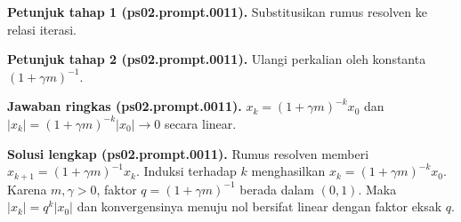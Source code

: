 \par\noindent\textbf{Petunjuk tahap 1 (ps02.prompt.0011).}
Substitusikan rumus resolven ke relasi iterasi.
\label{orig03:ps02:hint1:0011}
\par\noindent\textbf{Petunjuk tahap 2 (ps02.prompt.0011).}
Ulangi perkalian oleh konstanta $(1+\gamma m)^{-1}$.
\label{orig03:ps02:hint2:0011}
\par\noindent\textbf{Jawaban ringkas (ps02.prompt.0011).}
$x_k=(1+\gamma m)^{-k}x_0$ dan
$|x_k|=(1+\gamma m)^{-k}|x_0|\to0$ secara linear.
\label{orig03:ps02:answer:0011}
\par\noindent\textbf{Solusi lengkap (ps02.prompt.0011).}
Rumus resolven memberi
$x_{k+1}=(1+\gamma m)^{-1}x_k$. Induksi terhadap $k$ menghasilkan
$x_k=(1+\gamma m)^{-k}x_0$. Karena $m,\gamma>0$, faktor
$q=(1+\gamma m)^{-1}$ berada dalam $(0,1)$. Maka
$|x_k|=q^k|x_0|$ dan konvergensinya menuju nol bersifat linear dengan faktor
eksak $q$.
\label{orig03:ps02:solution:0011}
